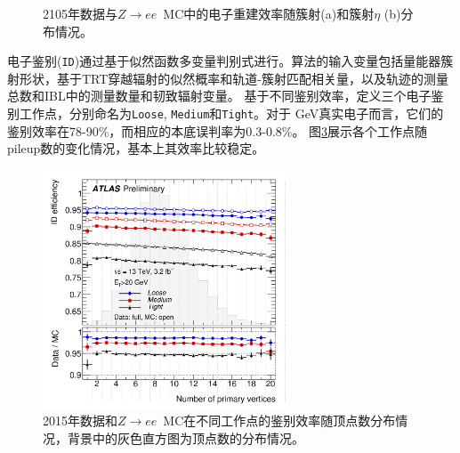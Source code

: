 \begin{figure}[h]
\begin{center}
\begin{subfigure}[b]{0.45\textwidth}
      \caption{}
      \label{fig:ele_reco_eta_eff}
  \end{subfigure}
\caption{2105年数据与$Z\rightarrow ee$~MC中的电子重建效率随簇射\et (a)和簇射$\eta$ (b)分布情况\cite{ATLAS-CONF-2016-024}。} 
 \label{fig:ele_reco_eff}
\end{center}
\end{figure}

电子鉴别(\texttt{ID})通过基于似然函数多变量判别式\cite{ATLAS-CONF-2016-024}进行。算法的输入变量包括量能器簇射形状，基于TRT穿越辐射的似然概率和轨道-簇射匹配相关量，以及轨迹的测量总数和IBL中的测量数量和韧致辐射变量。
基于不同鉴别效率，定义三个电子鉴别工作点，分别命名为\texttt{Loose}, \texttt{Medium}和\texttt{Tight}。对于 GeV真实电子而言，它们的鉴别效率在78-90\%，而相应的本底误判率为0.3-0.8\%。
图\ref{fig:ele_id_eff_pileup}展示各个工作点随pileup数的变化情况，基本上其效率比较稳定。
\begin{figure}
\centering
\includegraphics[width=0.65\textwidth]{fig/ele_id_eff_pileup.png}
\caption{2015年数据和$Z\rightarrow ee$~MC在不同工作点的鉴别效率随顶点数分布情况\cite{ATLAS-CONF-2016-024}，背景中的灰色直方图为顶点数的分布情况。}
\label{fig:ele_id_eff_pileup}
\end{figure}


